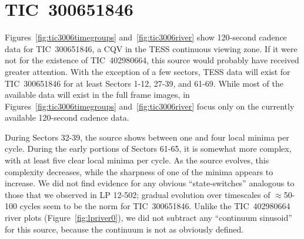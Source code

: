 \documentclass[11pt,twocolumn,tighten]{aastex63}
\begin{document}
\section{TIC~300651846}
\label{app:tic3006}

Figures~\ref{fig:tic3006timegroups} and~\ref{fig:tic3006river} show
120-second cadence data for TIC~300651846, a CQV in the TESS
continuous viewing zone.  If it were not for the existence of
TIC~402980664, this source would probably have received greater
attention.  With the exception of a few sectors, TESS data will exist
for TIC~300651846 for at least Sectors 1-12, 27-39, and 61-69.  While
most of the available data will exist in the full frame images, in
Figures~\ref{fig:tic3006timegroups} and~\ref{fig:tic3006river} focus
only on the currently available 120-second cadence data.

During Sectors 32-39, the source shows between one and four local
minima per cycle.  During the early portions of Sectors 61-65, it is
somewhat more complex, with at least five clear local minima per
cycle.  As the source evolves, this complexity decreases, while the
sharpness of one of the minima appears to increase.  We did not find
evidence for any obvious ``state-switches'' analogous to those that we
observed in LP 12-502; gradual evolution over timescales of
$\approx$50-100 cycles seem to be the norm for TIC~300651846.  Unlike
the TIC~402980664 river plots (Figure~\ref{fig:lpriver0}), we did not
subtract any ``continuum sinusoid'' for this source, because the
continuum is not as obviously defined.

\begin{figure*}[!t]
	\begin{center}
	\end{center}
	\vspace{-0.4cm}
	\caption{
		{\bf Light curve evolution of TIC 300651846}.
    All available 120-second cadence data as of 2023 Aug 11 are shown.
    Cycles 0 to 622 span TESS Sectors 32-39 (Nov 2020--June 2021);
    cycles 2296-2676 span Sectors 61-65 (Jan--June 2023).  We assumed
    a 8.254\,hr period and a fixed reference epoch (BTJD 2174.127) for
    both panels.  Light curve segments are split based on the presence
    of gaps longer than three hours.  Cycle numbers are listed in the
    lower-right of each light curve segment.
	}
	\label{fig:tic3006timegroups}
\end{figure*}
\end{document}
